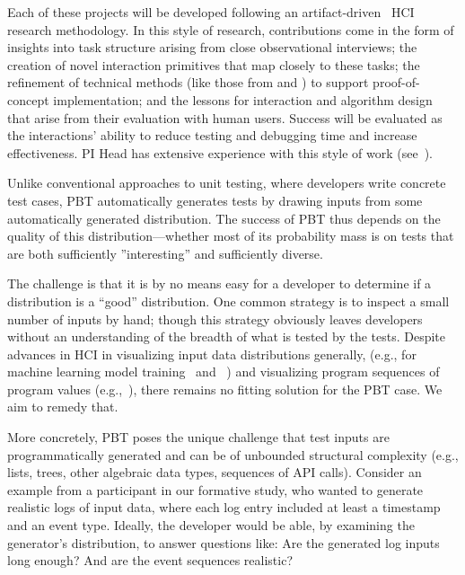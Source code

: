 Each of these projects will be developed following an
artifact-driven~\cite{ref:wobbrock2016research} HCI research methodology.
In this style of research, contributions come in the form of insights into task
structure arising from close observational interviews; the creation of novel
interaction primitives that map closely to these tasks; the refinement of
technical methods (like those from  and
) to support proof-of-concept implementation; and the
lessons for interaction and algorithm design that arise from their evaluation
with human users. Success will be evaluated as the interactions' ability to 
reduce
testing and debugging time and increase effectiveness.
PI Head has extensive experience with this style of work 
(see~\cite{ref:head2015tutorons,ref:suzuki2017tracediff,ref:head2017writing,ref:head2018when,ref:head2018interactive,ref:head2019managing,ref:head2020composing}).

%
Unlike conventional approaches to unit testing, where developers
write concrete test cases,
PBT automatically generates tests by drawing inputs from some
automatically generated distribution. The success of
PBT thus depends on the quality of this distribution---whether
most of its probability mass is on tests that are both sufficiently
''interesting'' and sufficiently diverse.

The challenge is that it is by no means easy for a developer to determine if a 
distribution is a ``good'' distribution. One common strategy is to inspect a 
small number of inputs by hand; though this strategy obviously leaves developers 
without an understanding of the breadth of what is tested by the tests.
Despite advances in HCI in visualizing input data distributions generally,
(e.g., for machine learning model training~\cite{ref:hohman2019gamut} and
~\cite{ref:hohman2020understanding}) and visualizing program sequences of 
program values (e.g.,~\cite{ref:kang2017omnicode}), there remains no fitting 
solution for the PBT case. We aim to remedy that.

More concretely, PBT poses the unique challenge that test inputs are
programmatically generated and
can be of unbounded structural
complexity (e.g., lists, trees, other algebraic data types,
sequences of API calls).
Consider an
example from a participant in our formative study, who wanted to generate
realistic logs of input data, where each log entry included at least a timestamp
and an event type.
Ideally, the developer would be able, by examining the generator's
distribution, to answer
questions like: Are the generated log inputs long enough? And are the
event sequences
realistic? 

